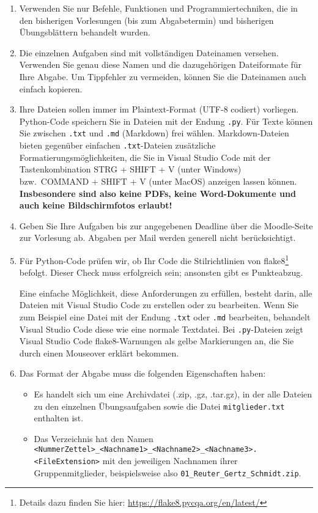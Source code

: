 \begin{enumerate}
    \item Verwenden Sie nur Befehle, Funktionen und Programmiertechniken, die in den bisherigen Vorlesungen (bis zum Abgabetermin) und bisherigen Übungsblättern behandelt wurden.

    \item Die einzelnen Aufgaben sind mit vollständigen Dateinamen versehen. Verwenden Sie genau diese Namen und die dazugehörigen Dateiformate für Ihre Abgabe. Um Tippfehler zu vermeiden, können Sie die Dateinamen auch einfach kopieren.

    \item Ihre Dateien sollen immer im Plaintext-Format (UTF-8 codiert) vorliegen. Python-Code speichern Sie in Dateien mit der Endung \texttt{.py}. Für Texte können Sie zwischen \texttt{.txt} und \texttt{.md} (Markdown) frei wählen. Markdown-Dateien bieten gegenüber einfachen \texttt{.txt}-Dateien zusätzliche Formatierungsmöglichkeiten, die Sie in Visual Studio Code mit der Tastenkombination STRG + SHIFT + V (unter Windows) bzw.~COMMAND + SHIFT + V (unter MacOS) anzeigen lassen können. \textbf{Insbesondere sind also keine PDFs, keine Word-Dokumente und auch keine Bildschirmfotos erlaubt!}

    \item Geben Sie Ihre Aufgaben bis zur angegebenen Deadline über die Moodle-Seite zur Vorlesung ab. Abgaben per Mail werden generell nicht berücksichtigt.

    \item Für Python-Code prüfen wir, ob Ihr Code die Stilrichtlinien von flake8\footnote{Details dazu finden Sie hier: \url{https://flake8.pycqa.org/en/latest/}} befolgt. Dieser Check muss erfolgreich sein; ansonsten gibt es Punkteabzug.

    Eine einfache Möglichkeit, diese Anforderungen zu erfüllen, besteht darin, alle Dateien mit Visual Studio Code zu erstellen oder zu bearbeiten. Wenn Sie zum Beispiel eine Datei mit der Endung \texttt{.txt} oder \texttt{.md} bearbeiten, behandelt Visual Studio Code diese wie eine normale Textdatei. Bei \texttt{.py}-Dateien zeigt Visual Studio Code flake8-Warnungen als gelbe Markierungen an, die Sie durch einen Mouseover erklärt bekommen.

    \item Das Format der Abgabe muss die folgenden Eigenschaften haben:
    \begin{itemize}
        \item Es handelt sich um eine Archivdatei (.zip, .gz, .tar.gz), in der alle Dateien zu den einzelnen Übungsaufgaben sowie die Datei \texttt{mitglieder.txt} enthalten ist. 
        \item Das Verzeichnis hat den Namen
        \lstinline{<NummerZettel>_<Nachname1>_<Nachname2>_<Nachname3>.<FileExtension>} mit den jeweiligen Nachnamen ihrer Gruppenmitglieder, beispielsweise also \lstinline{01_Reuter_Gertz_Schmidt.zip}.
    \end{itemize}
\end{enumerate}
